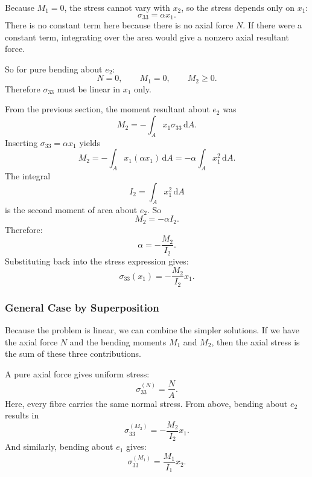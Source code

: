 Because $M_1 = 0$, the stress cannot vary with $x_2$, so the stress depends only on $x_1$:
\begin{equation*}
  \sigma_{33} = \alpha x_1
.\end{equation*}
There is no constant term here because there is no axial force $N$.
If there were a constant term, integrating over the area would give a nonzero axial resultant force.

So for pure bending about $e_2$:
\begin{equation*}
  N = 0, \qquad M_1 = 0, \qquad M_2 \geq 0
.\end{equation*}
Therefore $\sigma_{33}$ must be linear in $x_1$ only.

From the previous section, the moment resultant about $e_2$ was
\begin{equation*}
  M_2 = - \int_A x_1 \sigma_{33} \, \mathrm{d}A
.\end{equation*}
Inserting $\sigma_{33} = \alpha x_1$ yields
\begin{equation*}
  M_2 = - \int_A x_1 \left( \alpha x_1 \right)\, \mathrm{d}A = - \alpha \int_A x_1^2 \, \mathrm{d}A
.\end{equation*}
The integral
\begin{equation*}
  I_2 = \int_A x_1^2 \, \mathrm{d}A
\end{equation*}
is the second moment of area about $e_2$.
So
\begin{equation*}
  M_2 = - \alpha I_2
.\end{equation*}
Therefore:
\begin{equation*}
  \alpha = - \frac{M_2}{I_2}
.\end{equation*}
Substituting back into the stress expression gives:
\begin{equation*}
  \sigma_{33}(x_1) = - \frac{M_2}{I_2}x_1
.\end{equation*}

\subsubsection{General Case by Superposition}
Because the problem is linear, we can combine the simpler solutions.
If we have the axial force $N$ and the bending moments $M_1$ and $M_2$, then the axial stress is the sum of these three contributions.

A pure axial force gives uniform stress:
\begin{equation*}
  \sigma_{33}^{(N)} = \frac{N}{A}
.\end{equation*}
Here, every fibre carries the same normal stress.
From above, bending about $e_2$ results in
\begin{equation*}
  \sigma_{33}^{(M_2)} = - \frac{M_2}{I_2}x_1
.\end{equation*}
And similarly, bending about $e_1$ gives:
\begin{equation*}
  \sigma_{33}^{(M_1)} = \frac{M_1}{I_1}x_2
.\end{equation*}

